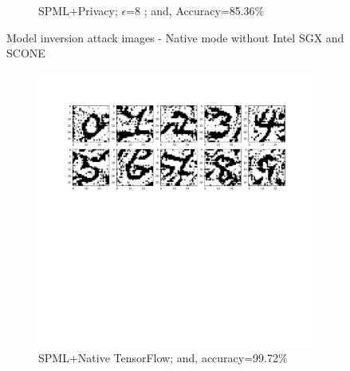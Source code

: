 \begin{figure}[h!]
\begin{subfigure}{.325\textwidth}
         \vspace{-8em}
         \caption{SPML+Privacy; $\epsilon$=8 ; and, Accuracy=85.36\%}
         \label{default}
     \end{subfigure}
        \caption{Model inversion attack images - Native mode without Intel SGX and SCONE}
        \label{default}
\end{figure}

\begin{figure}
     \begin{subfigure}{.325\textwidth}
         \includegraphics[width=\textwidth]{images/Sim_attack/Mnistattack_native.pdf}
         \vspace{-8em}
         \caption{SPML+Native TensorFlow; and, accuracy=99.72\%}
         \label{default}
     \end{subfigure}
     \begin{subfigure}{.325\textwidth}

\end{subfigure}
\end{figure}
